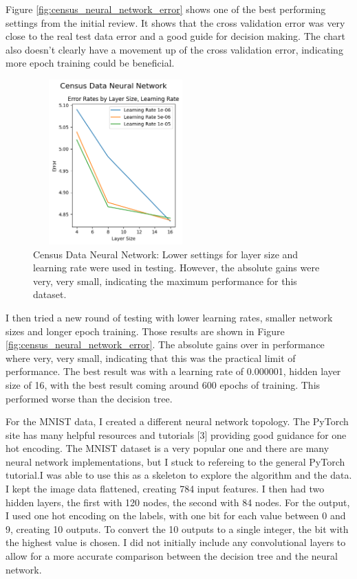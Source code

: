 \documentclass[letterpaper]{article} %
\begin{document}
Figure \ref{fig:census_neural_network_error} shows one of the best performing settings from the initial review.  It shows that the cross validation error was very close to the real test data error and a good guide for decision making.  The chart also doesn't clearly have a movement up of the cross validation error, indicating more epoch training could be beneficial.

\begin{figure}[htb]
\centering
\includegraphics[width=2.5in, height=2.5in]{figures/Census_Data_Neural_Network_Error_Rates_by_Layer_Size__Learning_Rate_census_v2.png}
\caption{Census Data Neural Network:   Lower settings for layer size and learning rate were used in testing.   However, the absolute gains were very, very small, indicating the maximum performance for this dataset.   }
\label{fig:census_neural_network_v2}
\end{figure}

I then tried a new round of testing with lower learning rates, smaller network sizes and longer epoch training.  Those results are shown in Figure \ref{fig:census_neural_network_error}.  The absolute gains over in performance where very, very small, indicating that this was the practical limit of performance.  The best result was with a learning rate of 0.000001, hidden layer size of 16, with the best result coming around 600 epochs of training.  This performed worse than the decision tree. 

For the MNIST data, I created a different neural network topology.  The PyTorch site has many helpful resources and tutorials [3] providing good guidance for one hot encoding.  The MNIST dataset is a very popular one and there are many neural network implementations, but I stuck to refereing to the general PyTorch tutorial.I was able to use this as a skeleton to explore the algorithm and the data. I kept the image data flattened, creating 784 input features.  I then had two hidden layers, the first with 120 nodes, the second with 84 nodes.  For the output, I used one hot encoding on the labels, with one bit for each value between 0 and 9, creating 10 outputs.  To convert the 10 outputs to a single integer, the bit with the highest value is chosen.  I did not initially include any convolutional layers to allow for a more accurate comparison between the decision tree and the neural network.
\end{document}
